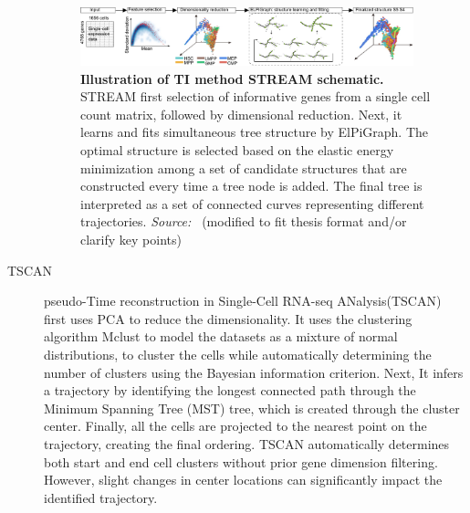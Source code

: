 \begin{description}
    \begin{figure}[ht!]
    	\centering
    	\includegraphics[width=0.95\textwidth]{TI_Alg_STREAM/fig}
    	\vspace{0.1cm}
    	\caption[Illustration of TI method STREAM schematic.]{\textbf{Illustration of TI method STREAM schematic.} STREAM first selection of informative genes from a single cell count matrix, followed by dimensional reduction. Next, it learns and fits simultaneous tree structure by ElPiGraph. The optimal structure is selected based on the elastic energy minimization among a set of candidate structures that are constructed every time a tree node is added. The final tree is interpreted as a set of connected curves representing different trajectories. \emph{Source:~\cite{chen2019stream}} (modified to fit thesis format and/or clarify key points)
    	}
    	\label{fig:TI_Alg_STREAM}
    \end{figure}

    \item[TSCAN]
    pseudo-Time reconstruction in Single-Cell RNA-seq ANalysis(TSCAN)~\citep{ji2016tscan} first uses PCA to reduce the dimensionality. It uses the clustering algorithm Mclust to model the datasets as a mixture of normal distributions, to cluster the cells while automatically determining the number of clusters using the Bayesian information criterion. Next, It infers a trajectory by identifying the longest connected path through the Minimum Spanning Tree (MST) tree, which is created through the cluster center. Finally, all the cells are projected to the nearest point on the trajectory, creating the final ordering. TSCAN automatically determines both start and end cell clusters without prior gene dimension filtering. However, slight changes in center locations can significantly impact the identified trajectory.


\end{description}
